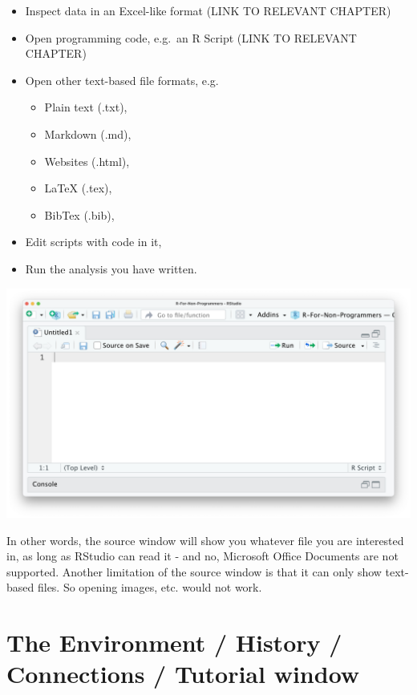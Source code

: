 \documentclass[
]{book}
\begin{document}
\begin{itemize}
\item
  Inspect data in an Excel-like format (LINK TO RELEVANT CHAPTER)
\item
  Open programming code, e.g.~an R Script (LINK TO RELEVANT CHAPTER)
\item
  Open other text-based file formats, e.g.

  \begin{itemize}
  \item
    Plain text (.txt),
  \item
    Markdown (.md),
  \item
    Websites (.html),
  \item
    LaTeX (.tex),
  \item
    BibTex (.bib),
  \end{itemize}
\item
  Edit scripts with code in it,
\item
  Run the analysis you have written.
\end{itemize}

\includegraphics{images/chapter_04_img/03_source_window/01_rstudio_source.png}

In other words, the source window will show you whatever file you are interested in, as long as RStudio can read it - and no, Microsoft Office Documents are not supported. Another limitation of the source window is that it can only show text-based files. So opening images, etc. would not work.

\hypertarget{the-environment-history-connections-tutorial-window}{%
\section{The Environment / History / Connections / Tutorial window}\label{the-environment-history-connections-tutorial-window}}
\end{document}
